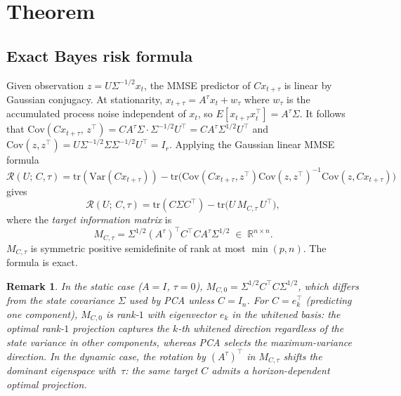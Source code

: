 \documentclass[final,3p,times]{elsarticle}
\newtheorem{remark}[theorem]{Remark}
\newcommand{\tr}{\mathrm{tr}}
\newcommand{\R}{\mathbb{R}}
\begin{document}
\section{Theorem}

\subsection{Exact Bayes risk formula}

Given observation $z = U \Sigma^{-1/2} x_t$, the MMSE predictor of
$Cx_{t+\tau}$ is linear by Gaussian conjugacy.
At stationarity, $x_{t+\tau} = A^\tau x_t + w_\tau$ where $w_\tau$
is the accumulated process noise independent of $x_t$, so
$E[x_{t+\tau}x_t^\top] = A^\tau\Sigma$.
It follows that
$\mathrm{Cov}(Cx_{t+\tau},\,z^\top)
 = CA^\tau\Sigma\cdot\Sigma^{-1/2}U^\top = CA^\tau\Sigma^{1/2}U^\top$
and $\mathrm{Cov}(z,z^\top) = U\Sigma^{-1/2}\Sigma\Sigma^{-1/2}U^\top = I_r$.
Applying the Gaussian linear MMSE formula
$\mathcal{R}(U;\,C,\tau)
 = \mathrm{tr}(\mathrm{Var}(Cx_{t+\tau}))
 - \mathrm{tr}\!\bigl(\mathrm{Cov}(Cx_{t+\tau},z^\top)
                       \mathrm{Cov}(z,z^\top)^{-1}
                       \mathrm{Cov}(z,Cx_{t+\tau})\bigr)$
gives
\begin{equation}
  \mathcal{R}(U;\,C,\tau)
    = \tr(C\Sigma C^\top) - \tr\!\bigl(U\,M_{C,\tau}\,U^\top\bigr),
\end{equation}
where the \emph{target information matrix} is
\begin{equation}
  M_{C,\tau}
    = \Sigma^{1/2}(A^\tau)^\top C^\top C A^\tau \Sigma^{1/2}
    \;\in\; \R^{n\times n}.
\end{equation}
$M_{C,\tau}$ is symmetric positive semidefinite of rank at most $\min(p,n)$.
The formula is exact.

\begin{remark}
In the static case ($A=I$, $\tau=0$),
$M_{C,0}=\Sigma^{1/2}C^\top C\Sigma^{1/2}$,
which differs from the state covariance $\Sigma$ used by PCA unless
$C=I_n$.
For $C=e_k^\top$ (predicting one component), $M_{C,0}$ is rank-$1$ with
eigenvector $e_k$ in the whitened basis: the optimal rank-$1$ projection
captures the $k$-th whitened direction regardless of the state variance in
other components, whereas PCA selects the maximum-variance direction.
In the dynamic case, the rotation by $(A^\tau)^\top$ in $M_{C,\tau}$
shifts the dominant eigenspace with~$\tau$: the same target $C$ admits a
horizon-dependent optimal projection.
\end{remark}
\end{document}
